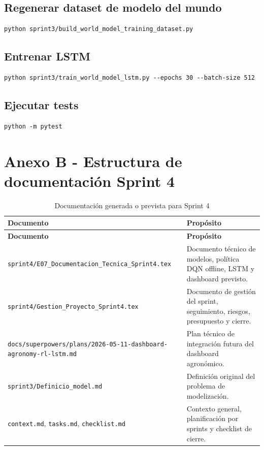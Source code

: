 \documentclass[11pt,a4paper]{article}
\begin{document}
\subsection{Regenerar dataset de modelo del mundo}

\begin{verbatim}
python sprint3/build_world_model_training_dataset.py
\end{verbatim}

\subsection{Entrenar LSTM}

\begin{verbatim}
python sprint3/train_world_model_lstm.py --epochs 30 --batch-size 512
\end{verbatim}

\subsection{Ejecutar tests}

\begin{verbatim}
python -m pytest
\end{verbatim}

\newpage

\section{Anexo B - Estructura de documentación Sprint 4}

\begin{longtable}{p{}p{}}
\caption{Documentación generada o prevista para Sprint 4}\\
\toprule
\textbf{Documento} & \textbf{Propósito} \\
\midrule
\endfirsthead
\toprule
\textbf{Documento} & \textbf{Propósito} \\
\midrule
\endhead
\texttt{sprint4/E07\_Documentacion\_Tecnica\_Sprint4.tex} & Documento técnico de modelos, política DQN offline, LSTM y dashboard previsto. \\
\texttt{sprint4/Gestion\_Proyecto\_Sprint4.tex} & Documento de gestión del sprint, seguimiento, riesgos, presupuesto y cierre. \\
\texttt{docs/superpowers/plans/2026-05-11-dashboard-agronomy-rl-lstm.md} & Plan técnico de integración futura del dashboard agronómico. \\
\texttt{sprint3/Definicio\_model.md} & Definición original del problema de modelización. \\
\texttt{context.md}, \texttt{tasks.md}, \texttt{checklist.md} & Contexto general, planificación por sprints y checklist de cierre. \\
\bottomrule
\end{longtable}
\end{document}
